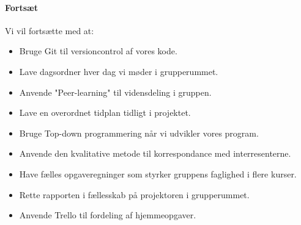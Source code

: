 \documentclass[oneside,a4paper,titlepage]{article}
\begin{document}
\paragraph{Fortsæt}
Vi vil fortsætte med at:
\begin{itemize}
  \item Bruge Git til versioncontrol af vores kode.
  \item Lave dagsordner hver dag vi møder i grupperummet.
  \item Anvende "Peer-learning" til vidensdeling i gruppen. 
  \item Lave en overordnet tidplan tidligt i projektet. 
  \item Bruge Top-down programmering når vi udvikler vores program.
  \item Anvende den kvalitative metode til korrespondance med interresenterne. 
  \item Have fælles opgaveregninger som styrker gruppens faglighed i flere kurser.
  \item Rette rapporten i fællesskab på projektoren i grupperummet.
  \item Anvende Trello til fordeling af hjemmeopgaver.
\end{itemize}
\end{document}
